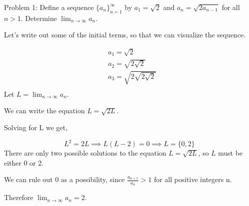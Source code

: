 Problem 1: Define a sequence $\{a_n\}_{n=1}^\infty$ by $a_1 = \sqrt{2}$ and $a_n = \sqrt{2a_{n-1}}$ for all $n > 1$. Determine $\displaystyle\lim_{n \rightarrow \infty} a_n$.

Let's write out some of the initial terms, so that we can visualize the sequence.

\begin{align*}
& a_1 = \sqrt 2 \\
& a_2 = \sqrt{2 \sqrt 2} \\
& a_3 = \sqrt{2 \sqrt{2 \sqrt 2}} \\
\end{align*}
Let $L = \lim_{n \rightarrow \infty} a_n$.

We can write the equation $L = \sqrt{2L}$.

Solving for L we get,

$$ L^2 = 2L \implies L(L - 2) = 0 \implies L = \{0, 2\} $$
There are only two possible solutions to the equation $L = \sqrt{2L}$, so $L$ must be either 0 or 2.

We can rule out 0 as a possibility, since $\frac{a_{n+1}}{a_n} > 1$ for all positive integers n.

Therefore $\boxed{\lim_{n \rightarrow \infty} a_n = 2}$.
